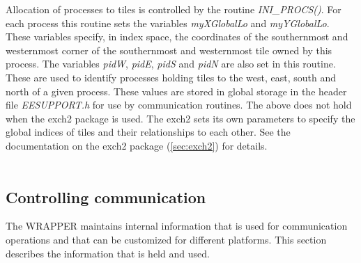 Allocation of processes to tiles is controlled by the routine {\em
  INI\_PROCS()}. For each process this routine sets the variables {\em
  myXGlobalLo} and {\em myYGlobalLo}.  These variables specify, in
index space, the coordinates of the southernmost and westernmost
corner of the southernmost and westernmost tile owned by this process.
The variables {\em pidW}, {\em pidE}, {\em pidS} and {\em pidN} are
also set in this routine. These are used to identify processes holding
tiles to the west, east, south and north of a given process. These
values are stored in global storage in the header file {\em
  EESUPPORT.h} for use by communication routines.  The above does not
hold when the exch2 package is used.  The exch2 sets its own
parameters to specify the global indices of tiles and their
relationships to each other.  See the documentation on the exch2
package (\ref{sec:exch2}) for details.
\\

 \\


\subsection{Controlling communication}
\label{sec:controlling_communication}
The WRAPPER maintains internal information that is used for communication
operations and that can be customized for different platforms. This section 
describes the information that is held and used.

